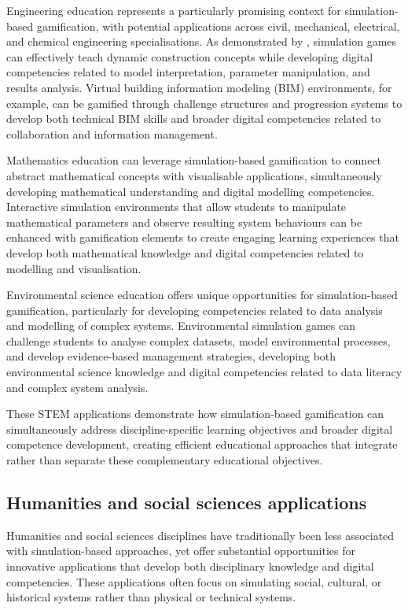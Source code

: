 \documentclass[cte]{acnsart}
\begin{document}
Engineering education represents a particularly promising context for simulation-based gamification, with potential applications across civil, mechanical, electrical, and chemical engineering specialisations. As demonstrated by \citet{Castronovo2015}, simulation games can effectively teach dynamic construction concepts while developing digital competencies related to model interpretation, parameter manipulation, and results analysis. Virtual building information modeling (BIM) environments, for example, can be gamified through challenge structures and progression systems to develop both technical BIM skills and broader digital competencies related to collaboration and information management.

Mathematics education can leverage simulation-based gamification to connect abstract mathematical concepts with visualisable applications, simultaneously developing mathematical understanding and digital modelling competencies. Interactive simulation environments that allow students to manipulate mathematical parameters and observe resulting system behaviours can be enhanced with gamification elements to create engaging learning experiences that develop both mathematical knowledge and digital competencies related to modelling and visualisation.

Environmental science education offers unique opportunities for simulation-based gamification, particularly for developing competencies related to data analysis and modelling of complex systems. Environmental simulation games can challenge students to analyse complex datasets, model environmental processes, and develop evidence-based management strategies, developing both environmental science knowledge and digital competencies related to data literacy and complex system analysis.

These STEM applications demonstrate how simulation-based gamification can simultaneously address discipline-specific learning objectives and broader digital competence development, creating efficient educational approaches that integrate rather than separate these complementary educational objectives.

\subsection{Humanities and social sciences applications}

Humanities and social sciences disciplines have traditionally been less associated with simulation-based approaches, yet offer substantial opportunities for innovative applications that develop both disciplinary knowledge and digital competencies. These applications often focus on simulating social, cultural, or historical systems rather than physical or technical systems.
\end{document}
